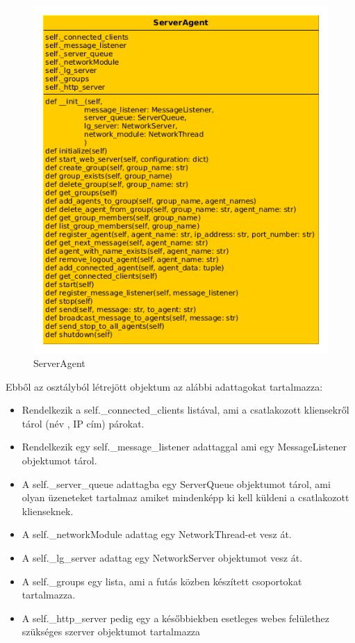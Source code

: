 \documentclass[a4paper,12pt,oneside]{report}
\begin{document}
    \begin{figure}[h]
      \includegraphics[width=13cm, keepaspectratio]{serveragent_class.png}
      \caption{ServerAgent }
      \label{fig:serveragent_class}
    \end{figure}

Ebből az osztályból létrejött objektum az alábbi adattagokat tartalmazza:
\begin{itemize}
    \itemsep0em
        \item Rendelkezik a self.\_connected\_clients listával, ami a csatlakozott kliensekről tárol (név , IP cím) párokat.
        \item Rendelkezik egy self.\_message\_listener adattaggal ami egy MessageListener objektumot tárol.
        \item A self.\_server\_queue adattagba egy ServerQueue objektumot tárol, ami olyan üzeneteket tartalmaz amiket mindenképp ki kell küldeni a csatlakozott klienseknek.       
        \item A self.\_networkModule adattag egy NetworkThread-et vesz át.
        \item A self.\_lg\_server adattag egy NetworkServer objektumot vesz át.
         \item A self.\_groups egy lista, ami a futás közben készített csoportokat tartalmazza.
        \item A self.\_http\_server pedig egy a későbbiekben esetleges webes felülethez szükséges szerver objektumot tartalmazza
\end{itemize}
\end{document}
